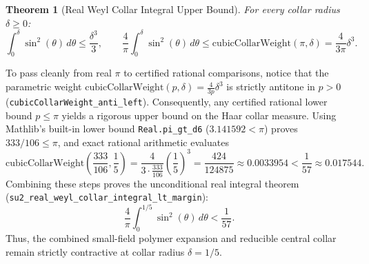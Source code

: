 \documentclass[11pt,a4paper]{article}
\newtheorem{theorem}{Theorem}[section]
\begin{document}
\begin{theorem}[Real Weyl Collar Integral Upper Bound]
For every collar radius $\delta \ge 0$:
\begin{equation}
\int_0^\delta \sin^2(\theta) \, d\theta \le \frac{\delta^3}{3}, \qquad \frac{4}{\pi} \int_0^\delta \sin^2(\theta) \, d\theta \le \mathrm{cubicCollarWeight}(\pi, \delta) = \frac{4}{3\pi} \delta^3.
\end{equation}
\end{theorem}

To pass cleanly from real $\pi$ to certified rational comparisons, notice that the parametric weight $\mathrm{cubicCollarWeight}(p, \delta) = \frac{4}{3p}\delta^3$ is strictly antitone in $p > 0$ (\texttt{cubicCollarWeight\_\-anti\_\-left}). Consequently, any certified rational lower bound $p \le \pi$ yields a rigorous upper bound on the Haar collar measure. Using Mathlib's built-in lower bound \texttt{Real.pi\_gt\_d6} ($3.141592 < \pi$) proves $333/106 \le \pi$, and exact rational arithmetic evaluates
\begin{equation}
\mathrm{cubicCollarWeight}\left(\frac{333}{106}, \frac{1}{5}\right) = \frac{4}{3 \cdot \frac{333}{106}} \left(\frac{1}{5}\right)^3 = \frac{424}{124875} \approx 0.0033954 < \frac{1}{57} \approx 0.017544.
\end{equation}
Combining these steps proves the unconditional real integral theorem (\texttt{su2\_\-real\_\-weyl\_\-collar\_\-integral\_\-lt\_\-margin}):
\begin{equation}
\frac{4}{\pi} \int_0^{1/5} \sin^2(\theta) \, d\theta < \frac{1}{57}.
\end{equation}
Thus, the combined small-field polymer expansion and reducible central collar remain strictly contractive at collar radius $\delta = 1/5$.
\end{document}
